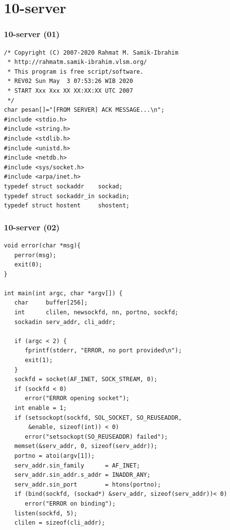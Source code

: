 \documentclass[xcolor=table, notheorems, hyperref={pdfpagelabels=false}]{beamer}
\begin{document}
\section{10-server}
\begin{frame}[fragile]
\frametitle{10-server (01)}
\begin{lstlisting}[basicstyle=\ttfamily\footnotesize]
/* Copyright (C) 2007-2020 Rahmat M. Samik-Ibrahim
 * http://rahmatm.samik-ibrahim.vlsm.org/
 * This program is free script/software.
 * REV02 Sun May  3 07:53:26 WIB 2020
 * START Xxx Xxx XX XX:XX:XX UTC 2007
 */
char pesan[]="[FROM SERVER] ACK MESSAGE...\n";
#include <stdio.h>
#include <string.h>
#include <stdlib.h>
#include <unistd.h>
#include <netdb.h>
#include <sys/socket.h>
#include <arpa/inet.h>
typedef struct sockaddr    sockad;
typedef struct sockaddr_in sockadin;
typedef struct hostent     shostent;

\end{lstlisting}
\end{frame}

\begin{frame}[fragile]
\frametitle{10-server (02)}
\begin{lstlisting}[basicstyle=\ttfamily\tiny]
void error(char *msg){
   perror(msg);
   exit(0);
}

int main(int argc, char *argv[]) {
   char     buffer[256];
   int      clilen, newsockfd, nn, portno, sockfd;
   sockadin serv_addr, cli_addr;

   if (argc < 2) {
      fprintf(stderr, "ERROR, no port provided\n");
      exit(1);
   }
   sockfd = socket(AF_INET, SOCK_STREAM, 0);
   if (sockfd < 0)
      error("ERROR opening socket");
   int enable = 1;
   if (setsockopt(sockfd, SOL_SOCKET, SO_REUSEADDR, 
       &enable, sizeof(int)) < 0)
      error("setsockopt(SO_REUSEADDR) failed");
   memset(&serv_addr, 0, sizeof(serv_addr));
   portno = atoi(argv[1]);
   serv_addr.sin_family      = AF_INET;
   serv_addr.sin_addr.s_addr = INADDR_ANY;
   serv_addr.sin_port        = htons(portno);
   if (bind(sockfd, (sockad*) &serv_addr, sizeof(serv_addr))< 0)
      error("ERROR on binding");
   listen(sockfd, 5);
   clilen = sizeof(cli_addr);

\end{lstlisting}
\end{frame}
\end{document}
